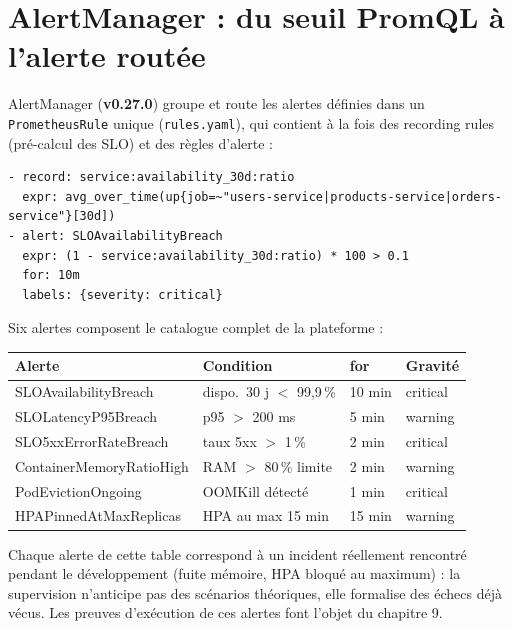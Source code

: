 \documentclass[12pt,a4paper,twoside,openright]{report}
\begin{document}
\section{AlertManager : du seuil PromQL à l'alerte routée}

AlertManager (\textbf{v0.27.0}) groupe et route les alertes définies dans un
\texttt{PrometheusRule} unique (\texttt{rules.yaml}), qui contient à la fois des
recording rules (pré-calcul des SLO) et des règles d'alerte :

\begin{lstlisting}[caption={Recording rule + alerte disponibilité : extraits exacts}]
- record: service:availability_30d:ratio
  expr: avg_over_time(up{job=~"users-service|products-service|orders-service"}[30d])
- alert: SLOAvailabilityBreach
  expr: (1 - service:availability_30d:ratio) * 100 > 0.1
  for: 10m
  labels: {severity: critical}
\end{lstlisting}

Six alertes composent le catalogue complet de la plateforme :

\begin{center}\end{center}
\begin{longtable}{@{}p{4.7cm}p{4.2cm}p{1.2cm}p{1.9cm}@{}}
\toprule
\textbf{Alerte} & \textbf{Condition} & \textbf{for} & \textbf{Gravité} \\
\midrule
\endhead
SLOAvailabilityBreach & dispo.\ 30 j $<$ 99,9\,\% & 10 min & critical \\
SLOLatencyP95Breach & p95 $>$ 200 ms & 5 min & warning \\
SLO5xxErrorRateBreach & taux 5xx $>$ 1\,\% & 2 min & critical \\
ContainerMemoryRatioHigh & RAM $>$ 80\,\% limite & 2 min & warning \\
PodEvictionOngoing & OOMKill détecté & 1 min & critical \\
HPAPinnedAtMaxReplicas & HPA au max 15 min & 15 min & warning \\
\bottomrule
\end{longtable}

\begin{whybox}[title={Alerter sur ce qui est déjà arrivé}]
Chaque alerte de cette table correspond à un incident réellement rencontré pendant
le développement (fuite mémoire, HPA bloqué au maximum) : la supervision n'anticipe
pas des scénarios théoriques, elle formalise des échecs déjà vécus. Les preuves
d'exécution de ces alertes font l'objet du chapitre 9.
\end{whybox}
\end{document}
